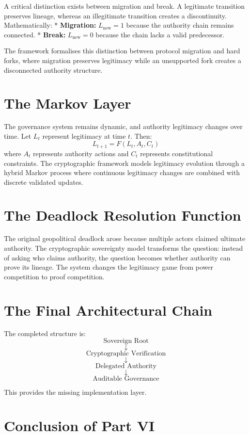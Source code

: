 \documentclass[11pt,openany]{book}
\theoremstyle{plain}
\theoremstyle{definition}
\begin{document}
A critical distinction exists between migration and break. A legitimate transition preserves lineage, whereas an illegitimate transition creates a discontinuity. Mathematically:
* \textbf{Migration:} \(L_{\text{new}} = 1\) because the authority chain remains connected.
* \textbf{Break:} \(L_{\text{new}} = 0\) because the chain lacks a valid predecessor.

The framework formalises this distinction between protocol migration and hard forks, where migration preserves legitimacy while an unsupported fork creates a disconnected authority structure.

\section*{The Markov Layer}

The governance system remains dynamic, and authority legitimacy changes over time. Let \(L_t\) represent legitimacy at time \(t\). Then:
\[
L_{t+1} = F(L_t, A_t, C_t)
\]
where \(A_t\) represents authority actions and \(C_t\) represents constitutional constraints. The cryptographic framework models legitimacy evolution through a hybrid Markov process where continuous legitimacy changes are combined with discrete validated updates.

\section*{The Deadlock Resolution Function}

The original geopolitical deadlock arose because multiple actors claimed ultimate authority. The cryptographic sovereignty model transforms the question: instead of asking who claims authority, the question becomes whether authority can prove its lineage. The system changes the legitimacy game from power competition to proof competition.

\section*{The Final Architectural Chain}

The completed structure is:
\[
\boxed{
\text{Sovereign Root}
}
\]
\[
\downarrow
\]
\[
\boxed{
\text{Cryptographic Verification}
}
\]
\[
\downarrow
\]
\[
\boxed{
\text{Delegated Authority}
}
\]
\[
\downarrow
\]
\[
\boxed{
\text{Auditable Governance}
}
\]

This provides the missing implementation layer.

\section*{Conclusion of Part VI}
\end{document}
